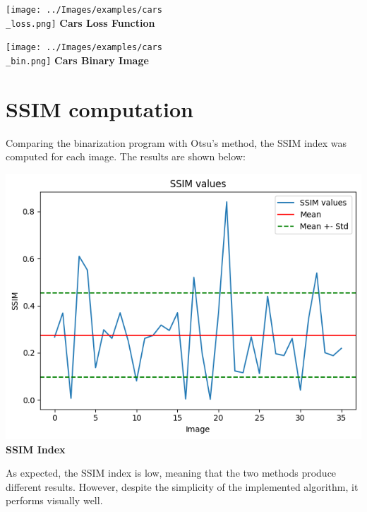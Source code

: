 \documentclass{article}
\begin{document}
\texttt{[image: ../Images/examples/cars\\\_loss.png]} \textbf{Cars Loss Function}

\texttt{[image: ../Images/examples/cars\\\_bin.png]} \textbf{Cars Binary Image}

\section{SSIM computation}

Comparing the binarization program with Otsu's method, the SSIM index was computed for each image. The results are shown below:

\includegraphics[scale=0.6]{../Images/examples/SSIM.png} \textbf{SSIM Index}

As expected, the SSIM index is low, meaning that the two methods produce different results. However, despite the simplicity of the implemented algorithm, it performs visually well.
\end{document}
